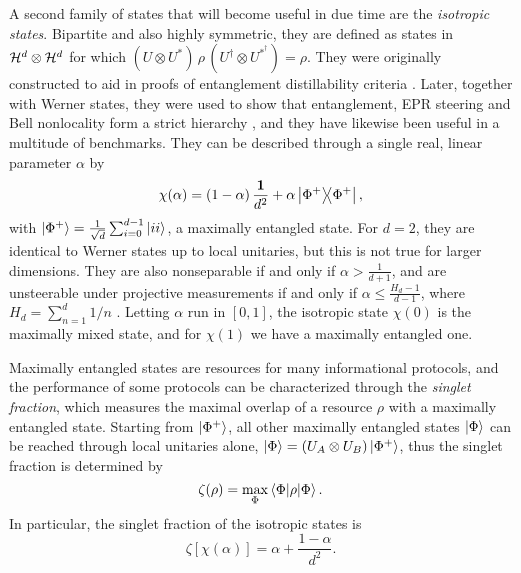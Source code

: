 		A second family of states that will become useful in due time are the \emph{isotropic states}. Bipartite and also highly symmetric, they are defined as states in $\mathcal{H}^{d} \otimes \mathcal{H}^{d}$ for which $(U \otimes U^*) \,\rho\, (U^\dagger \otimes U^{*^\dagger}) = \rho$. They were originally constructed to aid in proofs of entanglement distillability criteria \cite{horodecki_1999_isotropic}. Later, together with Werner states, they were used to show that entanglement, EPR steering and Bell nonlocality form a strict hierarchy \cite{wiseman_2007_steering,quintino_2015_inequivalence}, and they have likewise been useful in a multitude of benchmarks. They can be described through a single real, linear parameter $\alpha$ by
		\begin{equation}
			\chi(\alpha) = \left(1 - \alpha\right) \frac{\mathbf{1}}{d^2} + \alpha \ketbra{\Phi^+}{\Phi^+} ,
			\label{eq:isotropic-states}
		\end{equation}
		with $\ket{\Phi^+} = \frac{1}{\sqrt{d}} \sum_{i = 0}^{d - 1} \ket{ii}$, a maximally entangled state. For $d = 2$, they are identical to Werner states up to local unitaries, but this is not true for larger dimensions. They are also nonseparable if and only if $\alpha > \frac{1}{d+1}$, and are unsteerable under projective measurements if and only if $\alpha \leq \frac{H_d - 1}{d-1}$, where $H_d = \sum_{n=1}^d 1/n$ \cite{wiseman_2007_steering}. Letting $\alpha$ run in $[0,1]$, the isotropic state $\chi(0)$ is the maximally mixed state, and for $\chi(1)$ we have a maximally entangled one.
	
		Maximally entangled states are resources for many informational protocols, and the performance of some protocols can be characterized through the \emph{singlet fraction}, which measures the maximal overlap of a resource $\rho$ with a maximally entangled state. Starting from $\ket{\Phi^+}$, all other maximally entangled states $\ket{\Phi}$ can be reached through local unitaries alone, $\ket{\Phi} = (U_A \otimes U_B) \ket{\Phi^+}$, thus the singlet fraction is determined by
		$$
			\zeta(\rho) = \max_\Phi \left\langle \Phi \middle\vert \rho \middle\vert \Phi \right\rangle .
		$$
		In particular, the singlet fraction of the isotropic states is
		\begin{equation}
			\zeta\left[ \chi(\alpha) \right] = \alpha + \frac{1 - \alpha}{d^2} .
			\label{eq:singlet-fraction-isotropic-states}
		\end{equation}


